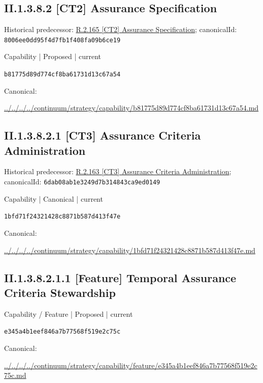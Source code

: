 \documentclass[10pt,a4paper]{article}
\begin{document}
\subsection*{II.1.3.8.2 [CT2] Assurance Specification}
Historical predecessor: \hyperref[element-8006ee0dd95f4d7fb1f408fa09b6ce19]{R.2.165 [CT2] Assurance Specification}; canonicalId: \texttt{8006ee0dd95f4d7fb1f408fa09b6ce19}\par
\label{element-b81775d89d774cf8ba61731d13c67a54}
{\small Capability | Proposed | current}\par
\texttt{b81775d89d774cf8ba61731d13c67a54}\par
Canonical: \par
{\footnotesize\url{../../../../continuum/strategy/capability/b81775d89d774cf8ba61731d13c67a54.md}}\par
\subsection*{II.1.3.8.2.1 [CT3] Assurance Criteria Administration}
Historical predecessor: \hyperref[element-6dab08ab1e3249d7b314843ca9ed0149]{R.2.163 [CT3] Assurance Criteria Administration}; canonicalId: \texttt{6dab08ab1e3249d7b314843ca9ed0149}\par
\label{element-1bfd71f24321428c8871b587d413f47e}
{\small Capability | Canonical | current}\par
\texttt{1bfd71f24321428c8871b587d413f47e}\par
Canonical: \par
{\footnotesize\url{../../../../continuum/strategy/capability/1bfd71f24321428c8871b587d413f47e.md}}\par
\subsection*{II.1.3.8.2.1.1 [Feature] Temporal Assurance Criteria Stewardship}
\label{element-e345a4b1eef846a7b77568f519e2c75c}
{\small Capability / Feature | Proposed | current}\par
\texttt{e345a4b1eef846a7b77568f519e2c75c}\par
Canonical: \par
{\footnotesize\url{../../../../continuum/strategy/capability/feature/e345a4b1eef846a7b77568f519e2c75c.md}}\par
\end{document}
